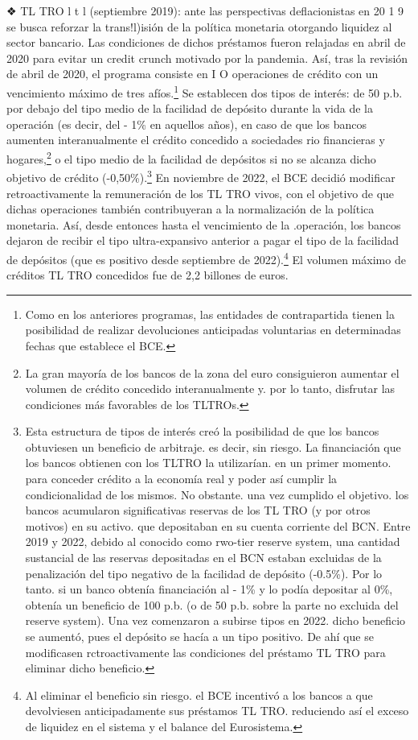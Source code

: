 \documentclass[10pt,a4paper]{article}
\begin{document}
{❖ TL TRO l t l (septiembre 2019): ante las perspectivas deflacionistas en 20 1 9 se busca reforzar la trans!l)isión de la política monetaria otorgando liquidez al sector bancario. Las condiciones de dichos préstamos fueron relajadas en abril de 2020 para evitar un credit crunch motivado por la pandemia. Así, tras la revisión de abril de 2020, el programa consiste en I O operaciones de crédito con un vencimiento máximo de tres afíos.\footnote{%
    Como en los anteriores programas, las entidades de contrapartida tienen la posibilidad de realizar devoluciones anticipadas voluntarias en determinadas fechas que establece el BCE.
} Se establecen dos tipos de interés: de 50 p.b. por debajo del tipo medio de la facilidad de depósito durante la vida de la operación (es decir, del - 1\% en aquellos años), en caso de que los bancos aumenten interanualmente el crédito concedido a sociedades rio financieras y hogares,\footnote{%
    La gran mayoría de los bancos de la zona del euro consiguieron aumentar el volumen de crédito concedido interanualmente y. por lo tanto, disfrutar las condiciones más favorables de los TLTROs.
} o el tipo medio de la facilidad de depósitos si no se alcanza dicho objetivo de crédito (-0,50\%).\footnote{%
    Esta estructura de tipos de interés creó la posibilidad de que los bancos obtuviesen un beneficio de arbitraje. es decir, sin riesgo. La financiación que los bancos obtienen con los TLTRO la utilizarían. en un primer momento. para conceder crédito a la economía real y poder así cumplir la condicionalidad de los mismos. No obstante. una vez cumplido el objetivo. los bancos acumularon significativas reservas de los TL TRO (y por otros motivos) en su activo. que depositaban en su cuenta corriente del BCN. Entre 2019 y 2022, debido al conocido como rwo-tier reserve system, una cantidad sustancial de las reservas depositadas en el BCN estaban excluidas de la penalización del tipo negativo de la facilidad de depósito (-0.5\%). Por lo tanto. si un banco obtenía financiación al - 1\% y lo podía depositar al 0\%, obtenía un beneficio de 100 p.b. (o de 50 p.b. sobre la parte no excluida del reserve system). Una vez comenzaron a subirse tipos en 2022. dicho beneficio se aumentó, pues el depósito se hacía a un tipo positivo. De ahí que se modificasen rctroactivamente las condiciones del préstamo TL TRO para eliminar dicho beneficio.
} En noviembre de 2022, el BCE decidió modificar retroactivamente la remuneración de los TL TRO vivos, con el objetivo de que dichas operaciones también contribuyeran a la normalización de la política monetaria. Así, desde entonces hasta el vencimiento de la .operación, los bancos dejaron de recibir el tipo ultra-expansivo anterior a pagar el tipo de la facilidad de depósitos (que es positivo desde septiembre de 2022).\footnote{%
    Al eliminar el beneficio sin riesgo. el BCE incentivó a los bancos a que devolviesen anticipadamente sus préstamos TL TRO. reduciendo así el exceso de liquidez en el sistema y el balance del Eurosistema.
} El volumen máximo de créditos TL TRO concedidos fue de 2,2 billones de euros.

}
\end{document}
